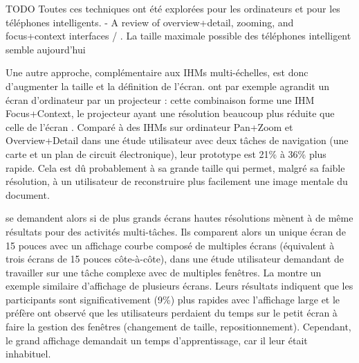 TODO Toutes ces techniques ont été explorées pour les ordinateurs et pour les téléphones intelligents.
\cite{Cockburn2008} - A review of overview+detail, zooming, and focus+context interfaces / 
\cite{Burigat2013}. La taille maximale possible des téléphones intelligent semble aujourd'hui

Une autre approche, complémentaire aux IHMs multi-échelles, est donc d'augmenter la taille et la définition de l'écran. \cite{Baudisch2002} ont par exemple agrandit un écran d'ordinateur par un projecteur : cette combinaison forme une IHM Focus+Context, le projecteur ayant une résolution beaucoup plus réduite que celle de l'écran . Comparé à des IHMs sur ordinateur Pan+Zoom et Overview+Detail dans une étude utilisateur avec deux tâches de navigation (une carte et un plan de circuit électronique), leur prototype est 21\% à 36\% plus rapide. Cela est dû probablement à sa grande taille qui permet, malgré sa faible résolution, à un utilisateur de reconstruire plus facilement une image mentale du document.



\cite{Czerwinski2003} se demandent alors si de plus grands écrans hautes résolutions mènent à de même résultats pour des activités multi-tâches. Ils comparent alors un unique écran de 15 pouces avec un affichage courbe composé de multiples écrans (équivalent à trois écrans de 15 pouces côte-à-côte), dans une étude utilisateur demandant de travailler sur une tâche complexe avec de multiples fenêtres. La  montre un exemple similaire d'affichage de plusieurs écrans. Leurs résultats indiquent que les participants sont significativement (9\%) plus rapides avec l'affichage large et le préfère \citeauthor{Czerwinski2003} ont observé que les utilisateurs perdaient du temps sur le petit écran à faire la gestion des fenêtres (changement de taille, repositionnement). Cependant, le grand affichage demandait un temps d'apprentissage, car il leur était inhabituel.


